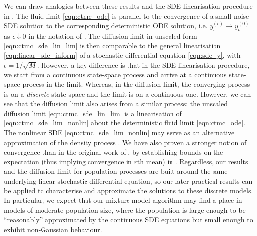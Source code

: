 We can draw analogies between these results and the SDE linearisation procedure in .
The fluid limit \cref{eqn:ctmc_ode} is parallel to the convergence of a small-noise SDE solution to the corresponding deterministic ODE solution, i.e. \(y_t^{(\epsilon)} \to y_t^{(0)}\) as \(\epsilon \downarrow 0\) in the notation of .
The diffusion limit in unscaled form \cref{eqn:ctmc_sde_lin_lim} is then comparable to the general linearisation \cref{eqn:linear_sde_inform} of a stochastic differential equation \cref{eqn:sde_y}, with \(\epsilon = 1/\sqrt{M}\).
However, a key difference is that in the SDE linearisation procedure, we start from a continuous state-space process and arrive at a continuous state-space process in the limit.
Whereas, in the diffusion limit, the converging process is on a \emph{discrete} state space and the limit is on a continuous one.
However, we can see that the diffusion limit also arises from a similar process: the unscaled diffusion limit \cref{eqn:ctmc_sde_lin_lim} is a linearisation of \cref{eqn:ctmc_sde_lim_nonlin} about the deterministic fluid limit \cref{eqn:ctmc_ode}.
The nonlinear SDE \cref{eqn:ctmc_sde_lim_nonlin} may serve as an alternative approximation of the density process \citep{Allen_2017_PrimerStochasticEpidemic}.
We have also proven a stronger notion of convergence than in the original work of \citet{Kurtz_1971_LimitTheoremsSequences,Kurtz_1970_SolutionsOrdinaryDifferential}, by establishing bounds on the expectation (thus implying convergence in \(r\)th mean) in .
Regardless, our results and the diffusion limit for population processes are built around the same underlying linear stochastic differential equation, so our later practical results can be applied to characterise and approximate the solutions to these discrete models.
In particular, we expect that our mixture model algorithm may find a place in models of moderate population size, where the population is large enough to be ``reasonably'' approximated by the continuous SDE equations but small enough to exhibit non-Gaussian behaviour.

